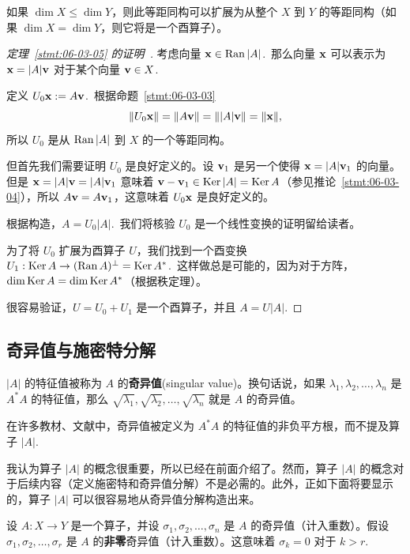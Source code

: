 如果 $\dim X \leq \dim Y$，则此等距同构可以扩展为从整个 $X$ 到 $Y$ 的等距同构（如果 $\dim X = \dim Y$，则它将是一个酉算子）。

\begin{proof}[\normalfont\heiti 定理~\ref{stmt:06-03-05} 的证明~\nopunct]考虑向量 $\mathbf{x} \in \operatorname{Ran} |A|$.~那么向量 $\mathbf{x}$ 可以表示为 $\mathbf{x} = |A|\mathbf{v}$ 对于某个向量 $\mathbf{v} \in X$.~

定义 $U_0 \mathbf{x} := A\mathbf{v}$.~根据命题~\ref{stmt:06-03-03}
$$\|U_0 \mathbf{x}\| = \|A\mathbf{v}\| = \||A|\mathbf{v}\| = \|\mathbf{x}\|,$$
所以 $U_0$ 是从 $\operatorname{Ran} |A|$ 到 $X$ 的一个等距同构。

但首先我们需要证明 $U_0$ 是良好定义的。设 $\mathbf{v}_1$ 是另一个使得 $\mathbf{x} = |A|\mathbf{v}_1$ 的向量。但是 $\mathbf{x} = |A|\mathbf{v} = |A|\mathbf{v}_1$ 意味着 $\mathbf{v} - \mathbf{v}_1 \in \operatorname{Ker} |A| = \operatorname{Ker} A$（参见推论~\ref{stmt:06-03-04}），所以 $A\mathbf{v} = A\mathbf{v}_1$，这意味着 $U_0 \mathbf{x}$ 是良好定义的。

根据构造，$A = U_0|A|$.~我们将核验 $U_0$ 是一个线性变换的证明留给读者。

为了将 $U_0$ 扩展为酉算子 $U$，我们找到一个酉变换 $U_1 : \operatorname{Ker} A \to (\operatorname{Ran} A)^\perp = \operatorname{Ker} A^*$.~这样做总是可能的，因为对于方阵，$\dim \operatorname{Ker} A = \dim\operatorname{Ker}  A^*$（根据秩定理）。

很容易验证，$U = U_0 + U_1$ 是一个酉算子，并且 $A = U |A|$.\end{proof}

\subsection{奇异值与施密特分解}\label{sec:06-03-03}

\begin{definition*}
$|A|$ 的特征值被称为 $A$ 的\textbf{奇异值}(singular value)。换句话说，如果 $\lambda_1, \lambda_2, \dots, \lambda_n$ 是 $A^*A$ 的特征值，那么 $\sqrt{\lambda_1}, \sqrt{\lambda_2}, \dots, \sqrt{\lambda_n}$ 就是 $A$ 的奇异值。
\end{definition*}

\begin{remark*}
在许多教材、文献中，奇异值被定义为 $A^*A$ 的特征值的非负平方根，而不提及算子 $|A|$.~
\end{remark*}

我认为算子 $|A|$ 的概念很重要，所以已经在前面介绍了。然而，算子 $|A|$ 的概念对于后续内容（定义施密特和奇异值分解）不是必需的。此外，正如下面将要显示的，算子 $|A|$ 可以很容易地从奇异值分解构造出来。

设 $A: X \to Y$ 是一个算子，并设 $\sigma_1, \sigma_2, \dots, \sigma_n$ 是 $A$ 的奇异值（计入重数）。假设 $\sigma_1, \sigma_2, \dots, \sigma_r$ 是 $A$ 的\textbf{非零}奇异值（计入重数）。这意味着 $\sigma_k = 0$ 对于 $k > r$.~


